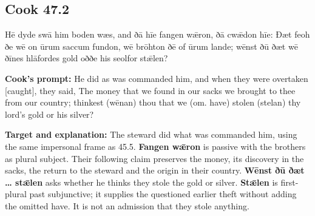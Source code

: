 \par\begin{minipage}{\linewidth}\raggedright
\subsection*{Cook 47.2}

Hē dyde swā him boden wæs, and ðā hīe fangen wǣron, ðā cwǣdon hīe: Ðæt feoh ðe wē on ūrum saccum fundon, wē brōhton ðē of ūrum lande; wēnst ðū ðæt wē ðīnes hlāfordes gold oððe his seolfor stǣlen?

\textbf{Cook’s prompt:} He did as was commanded him, and when they were overtaken [caught], they said, The money that we found in our sacks we brought to thee from our country; thinkest (wēnan) thou that we (om. have) stolen (stelan) thy lord’s gold or his silver?

\textbf{Target and explanation:} The steward did what was commanded him, using the same impersonal frame as 45.5. \textbf{Fangen wǣron} is passive with the brothers as plural subject. Their following claim preserves the money, its discovery in the sacks, the return to the steward and the origin in their country. \textbf{Wēnst ðū ðæt … stǣlen} asks whether he thinks they stole the gold or silver. \textbf{Stǣlen} is first-plural past subjunctive; it supplies the questioned earlier theft without adding the omitted have. It is not an admission that they stole anything.

\end{minipage}\par\addvspace{4pt}

